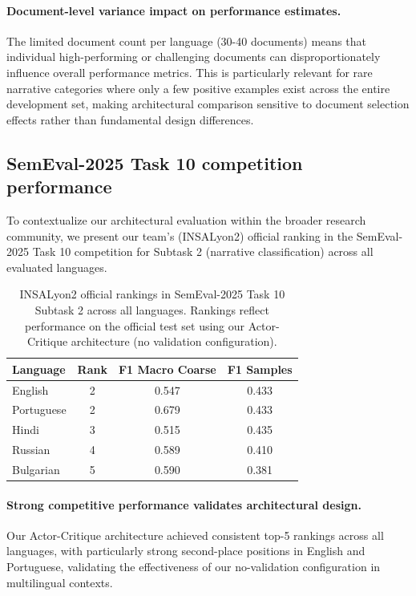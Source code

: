 \paragraph{Document-level variance impact on performance estimates.} The limited document count per language (30-40 documents) means that individual high-performing or challenging documents can disproportionately influence overall performance metrics. This is particularly relevant for rare narrative categories where only a few positive examples exist across the entire development set, making architectural comparison sensitive to document selection effects rather than fundamental design differences.

\subsection{SemEval-2025 Task 10 competition performance}

To contextualize our architectural evaluation within the broader research community, we present our team's (INSALyon2) official ranking in the SemEval-2025 Task 10 competition for Subtask 2 (narrative classification) across all evaluated languages.

\begin{table}[htbp]
\centering
\caption{INSALyon2 official rankings in SemEval-2025 Task 10 Subtask 2 across all languages. Rankings reflect performance on the official test set using our Actor-Critique architecture (no validation configuration).}
\label{tab:semeval_rankings}
\small
\begin{tabular}{lccc}
\hline
\textbf{Language} & \textbf{Rank} & \textbf{F1 Macro Coarse} & \textbf{F1 Samples} \\
\hline
English & 2 & 0.547 & 0.433 \\
Portuguese & 2 & 0.679 & 0.433 \\
Hindi & 3 & 0.515 & 0.435 \\
Russian & 4 & 0.589 & 0.410 \\
Bulgarian & 5 & 0.590 & 0.381 \\
\hline
\end{tabular}
\end{table}

\paragraph{Strong competitive performance validates architectural design.} Our Actor-Critique architecture achieved consistent top-5 rankings across all languages, with particularly strong second-place positions in English and Portuguese, validating the effectiveness of our no-validation configuration in multilingual contexts.

